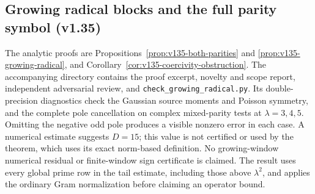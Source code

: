 \documentclass[11pt]{article}
\theoremstyle{remark}
\begin{document}
\subsection*{Growing radical blocks and the full parity symbol (v1.35)}
The analytic proofs are Propositions~\ref{prop:v135-both-parities} and
\ref{prop:v135-growing-radical}, and
Corollary~\ref{cor:v135-coercivity-obstruction}.  The accompanying directory
 contains the proof excerpt, novelty and
scope report, independent adversarial review, and
\texttt{check\_growing\_radical.py}.  Its double-precision diagnostics check
the Gaussian source moments and Poisson symmetry, and the complete pole
cancellation on complex mixed-parity tests at $\lambda=3,4,5$.
Omitting the negative odd pole produces a visible nonzero error in each
case.  A numerical estimate suggests $D=15$; this value is not certified
or used by the theorem, which uses its exact norm-based definition.
No growing-window numerical residual or finite-window sign certificate is
claimed.  The result uses every global prime row in the tail estimate,
including those above $\lambda^2$, and applies the ordinary Gram
normalization before claiming an operator bound.
\end{document}
